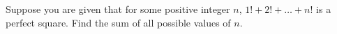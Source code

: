 Suppose you are given that for some positive integer $n$, $1! + 2! + \ldots + n!$ is a perfect square. Find the sum of all possible values of $n$.
